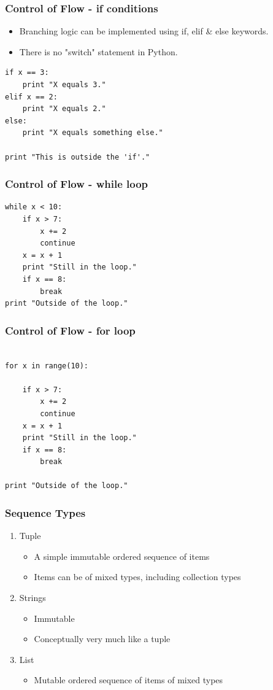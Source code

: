 \documentclass[12pt,handout]{beamer}
\begin{document}
\begin{frame}[fragile]
\frametitle{Control of Flow - if conditions}
\begin{itemize}
\item Branching logic can be implemented using if, elif \& else keywords.
\item There is no "switch" statement in Python.
\end{itemize}

\small{
\begin{verbatim}
if x == 3:
    print "X equals 3."
elif x == 2:
    print "X equals 2."
else:
    print "X equals something else."

print "This is outside the 'if'."

\end{verbatim}
}
\end{frame}

\begin{frame}[fragile]
\frametitle{Control of Flow - while loop}
\small{
\begin{verbatim}
while x < 10:
    if x > 7:
        x += 2
        continue
    x = x + 1
    print "Still in the loop."
    if x == 8:
        break
print "Outside of the loop."
\end{verbatim}
}
\end{frame}

\begin{frame}[fragile]
\frametitle{Control of Flow - for loop}
\small{
\begin{verbatim}

for x in range(10):
    
    if x > 7:
        x += 2
        continue
    x = x + 1
    print "Still in the loop."
    if x == 8:
        break

print "Outside of the loop."
\end{verbatim}
}
\end{frame}


\begin{frame}[fragile]
\frametitle{Sequence Types}
\begin{enumerate}
\item Tuple
\begin{itemize}
\item A simple immutable ordered sequence of items
\item Items can be of mixed types, including collection types
\end{itemize}
\item Strings
\begin{itemize}
\item Immutable
\item Conceptually very much like a tuple
\end{itemize}
\item List
\begin{itemize}
\item Mutable ordered sequence of items of mixed types
\end{itemize}
\end{enumerate}
\end{frame}
\end{document}
